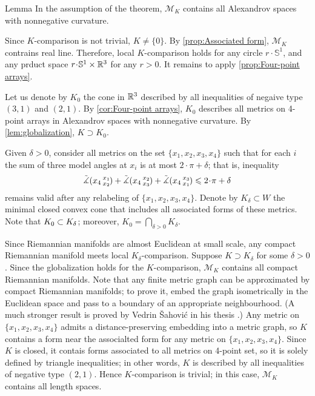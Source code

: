 \documentclass[a4paper,10pt]{article}
\begin{document}
\begin{thm}{Lemma}\label{lem:globalization}
In the assumption of the theorem, $\mathcal{M}_K$ contains all Alexandrov spaces with nonnegative curvature.
\end{thm}

Since $K$-comparison is not trivial, $K\ne\{0\}$.
By \ref{prop:Associated form}, $\mathcal{M}_K$ contrains real line.
Therefore, local $K$-comparison holds for any circle $r\cdot \mathbb{S}^1$, and any prduct space $r\cdot \mathbb{S}^1\times\RR^3$ for any $r>0$.
It remains to apply \ref{prop:Four-point arrays}.
\qeds

Let us denote by $K_0$ the cone in $\mathbb{R}^3$ described by all inequalities of negaive type $(3,1)$ and $(2,1)$.
By \ref{cor:Four-point arrays}, $K_0$ describes all metrics on 4-point arrays in Alexandrov spaces with nonnegative curvature.
By \ref{lem:globalization}, $K\supset K_0$.

Given $\delta>0$, consider all metrics on the set $\{x_1,x_2,x_3,x_4\}$ such that for each $i$
the sum of three model angles at $x_i$ is at most $2\cdot\pi+\delta$; that is, inequality
\[\angk{x_4}{x_1}{x_2}+\angk{x_4}{x_2}{x_3}+\angk{x_4}{x_3}{x_1}\le 2\cdot\pi+\delta\]
remains valid after any relabeling of $\{x_1,x_2,x_3,x_4\}$.
Denote by $K_\delta\subset W$ the minimal closed convex cone that includes all associated forms of these metrics.
Note that $K_0\z\subset K_\delta$;
moreover, $K_0=\bigcap_{\delta>0} K_\delta$.

Since Riemannian manifolds are almost Euclidean at small scale,
any compact Riemannian manifold meets local $K_\delta$-comparison.
Suppose $K\supset K_\delta$ for some $\delta>0$.
Since the globalization holds for the $K$-comparison, $\mathcal{M}_K$ contains all compact Riemannian manifolds.
Note that any finite metric graph can be approximated by compact Riemannian manifolds;
to prove it, embed the graph isometrically in the Euclidean space and pass to a boundary of an appropriate neighbourhood.
(A much stronger result is proved by Vedrin Šahović in his thesis \cite{sahovic2009}.)
Any metric on $\{x_1,x_2,x_3,x_4\}$ admits a distance-preserving embedding into a metric graph, so $K$ contains a form near the associalted form for any metric on $\{x_1,x_2,x_3,x_4\}$.
Since $K$ is closed, it contais forms associated to all metrics on 4-point set, so it is solely defined by triangle inequalities;
in other words, $K$ is described by all inequalities of negative type $(2,1)$.
Hence $K$-comparison is trivial; in this case, $\mathcal{M}_K$ contains all length spaces.
\end{document}
